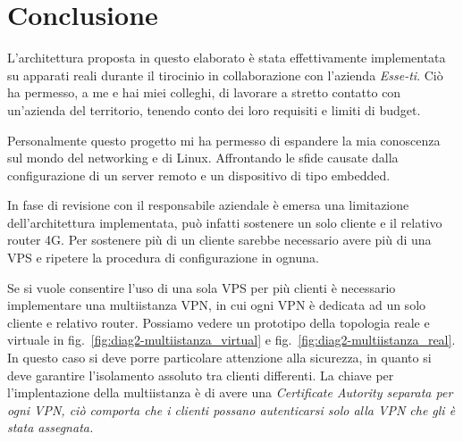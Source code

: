 \chapter{Conclusione \workinprogress}

L'architettura proposta in questo elaborato è stata effettivamente implementata su apparati reali durante il tirocinio in collaborazione con l'azienda \textit{Esse-ti}. Ciò ha permesso, a me e hai miei colleghi, di lavorare a stretto contatto con un'azienda del territorio, tenendo conto dei loro requisiti e limiti di budget.


Personalmente questo progetto mi ha permesso di espandere la mia conoscenza sul mondo del networking e di Linux. Affrontando le sfide causate dalla configurazione di un server remoto e un dispositivo di tipo embedded.


In fase di revisione con il responsabile aziendale è emersa una limitazione dell'architettura implementata, può infatti sostenere un solo cliente e il relativo router 4G. Per sostenere più di un cliente sarebbe necessario avere più di una VPS e ripetere la procedura di configurazione in ognuna. 

Se si vuole consentire l'uso di una sola VPS per più clienti è necessario implementare una multiistanza VPN, in cui ogni VPN è dedicata ad un solo cliente e relativo router. Possiamo vedere un prototipo della topologia reale e virtuale in fig.~\ref{fig:diag2-multiistanza_virtual} e fig.~\ref{fig:diag2-multiistanza_real}. In questo caso si deve porre particolare attenzione alla sicurezza, in quanto si deve garantire l'isolamento assoluto tra clienti differenti. La chiave per l'implentazione della multiistanza è di avere una \it{Certificate Autority} separata per ogni VPN, ciò comporta che i clienti possano autenticarsi solo alla VPN che gli è stata assegnata.


